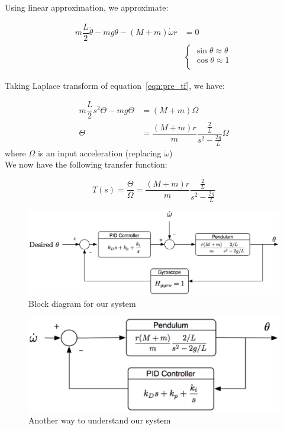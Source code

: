 \documentclass{notes}
\begin{document}
Using linear approximation, we approximate:

\begin{align}
  m\dfrac{L}{2}\ddot{\theta} - mg\theta - (M+m)\dot{\omega}r & = 0 \label{eqn:pre_tf} \\ 
  & \begin{cases}
    \sin\theta \approx \theta \nonumber\\
    \cos\theta \approx 1\nonumber\\
  \end{cases}
\end{align}
 
\noindent Taking Laplace transform of equation~\ref{eqn:pre_tf}, we have: 

\begin{align*}
  m\dfrac{L}{2}s^2\Theta - mg\Theta & = (M+m)\Omega \\
  \Theta & = \dfrac{(M+m)r}{m}\dfrac{\frac{2}{L}}{s^2 - \frac{2g}{L}}\Omega
\end{align*}
where $\Omega$ is an input acceleration (replacing $\dot{\omega}$)\\

\noindent We now have the following transfer function:

\[
  T(s) = \dfrac{\Theta}{\Omega} = \dfrac{(M+m)r}{m}\dfrac{\frac{2}{L}}{s^2-\frac{2g}{L}}
\]

\begin{figure}[!h]
  \begin{center}
    \includegraphics[width=5 in]{pics/Block_Diagram_2.eps}
  \end{center}
  \caption{Block diagram for our system}
  \label{fig:block_diagram}
\end{figure}

\begin{figure}[!h]
  \begin{center}
    \includegraphics[width=4 in]{pics/Block_Diagram_3.eps}
  \end{center}
  \caption{Another way to understand  our system}
  \label{fig:block_diagram_3}
\end{figure}
\end{document}
